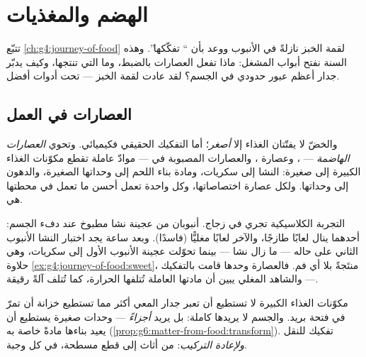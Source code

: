 \chapter{الهضم والمغذيات}\label{ch:g7:digestion-and-nutrients}

تتبّع \cref{ch:g4:journey-of-food} لقمة الخبز نازلةً في الأنبوب
ووعد بأن `` تفكّكها''. وهذه السنة نفتح أبواب
المشغل: ماذا تفعل العصارات بالضبط، وما  التي تنتجها، وكيف
يدبّر جدار  أعظم عبور حدودي في الجسم؟ لقد عادت لقمة
الخبز --- تحت أدوات أفضل.

\section{العصارات في العمل}

\begin{proposition}\label{prop:g7:digestion-and-nutrients:chemical}
 والخضّ لا يفتّتان الغذاء إلا \emph{أصغر}؛ أما التفكيك
الحقيقي فكيميائي. وتحوي \emph{العصارات
الهاضمة} --- ، وعصارة ، والعصارات
المصبوبة في  --- موادّ عاملة تقطع مكوّنات الغذاء
الكبيرة إلى صغيرة: النشا إلى سكريات، ومادة بناء اللحم  إلى
وحداتها الصغيرة، والدهون إلى وحداتها. ولكل عصارة اختصاصاتها،
وكل واحدة تعمل أحسن ما تعمل في  محطتها هي.
\end{proposition}
\admitted

\begin{example}\label{ex:g7:digestion-and-nutrients:bench}
التجربة الكلاسيكية تجري  في زجاج. أنبوبان من عجينة نشا مطبوخ
عند دفء الجسم: أحدهما ينال لعابًا طازجًا، والآخر لعابًا مغليًّا
(فاسدًا). وبعد ساعة يجد اختبار النشا الأنبوب الثاني على حاله ---
ما زال نشا --- بينما تحوّلت عجينة الأنبوب الأول إلى سكريات، وهي
 حلاوة \cref{ex:g4:journey-of-food:sweet}، منتَجةً بلا أي فم.
فالعصارة وحدها قامت بالتفكيك --- والشاهد المغلي يبين أن مادتها
العاملة تُتلفها الحرارة، كما تُتلف آلةً رقيقة.
\end{example}

\begin{remark}\label{rem:g7:digestion-and-nutrients:why}
مكوّنات الغذاء الكبيرة لا تستطيع أن تعبر جدار المعي أكثر مما تستطيع
خزانة أن تمرّ في فتحة بريد. والجسم لا يريدها كاملة: بل يريد
\emph{أجزاءً} --- وحدات صغيرة يستطيع أن يعيد بناءها مادةً خاصة به
(\cref{prop:g6:matter-from-food:transform}).  تفكيك للنقل
\emph{ولإعادة التركيب}: من أثاث إلى قطع مسطحة، في كل وجبة.
\end{remark}

